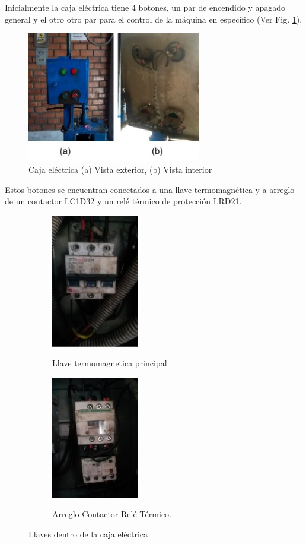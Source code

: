 \documentclass[main_conf.tex]{subfiles}
\begin{document}
Inicialmente la caja eléctrica tiene 4 botones, un par de encendido y
apagado general y el otro otro par para el control de la máquina en 
específico (Ver Fig. \ref{caja_electrica_tapa}).

\begin{figure}[!t]
  \centering
  \includegraphics[width=3.0in]{../img/caja_electrica_tapa.jpg}
  \caption{Caja eléctrica (a) Vista exterior, (b) Vista interior}
  \label{caja_electrica_tapa}
\end{figure}

Estos botones se encuentran conectados a una llave termomagnética
y a arreglo de un contactor LC1D32 y un relé térmico de protección
LRD21.


\begin{figure}[t]
  \centering
  \begin{subfigure}[b]{0.5\textwidth}
    \centering
    \includegraphics[width=1.5in]{../img/caja_electrica_llave_a.png}
    \label{caja_electrica_llave_a}
    \caption{Llave termomagnetica principal}
  \end{subfigure}
     
  \begin{subfigure}[b]{0.5\textwidth}
    \centering
    \includegraphics[width=1.5in]{../img/caja_electrica_llave_b.png}
    \label{caja_electrica_llave_b}
    \caption{Arreglo Contactor-Relé Térmico.}
  \end{subfigure}

  \caption{Llaves dentro de la caja eléctrica}
  \label{caja_electrica_llaves}
\end{figure}
 
\end{document}
